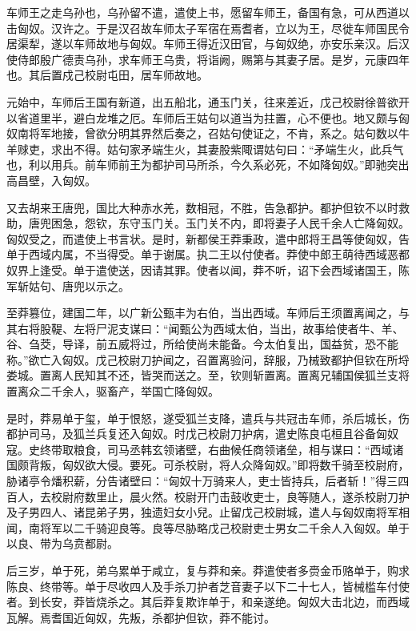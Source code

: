 \documentclass[12pt,UTF8]{ctexbook}
\begin{document}
车师王之走乌孙也，乌孙留不遣，遣使上书，愿留车师王，备国有急，可从西道以击匈奴。汉许之。于是汉召故车师太子军宿在焉耆者，立以为王，尽徙车师国民令居渠犁，遂以车师故地与匈奴。车师王得近汉田官，与匈奴绝，亦安乐亲汉。后汉使侍郎殷广德责乌孙，求车师王乌贵，将诣阙，赐第与其妻子居。是岁，元康四年也。其后置戍己校尉屯田，居车师故地。



元始中，车师后王国有新道，出五船北，通玉门关，往来差近，戊己校尉徐普欲开以省道里半，避白龙堆之厄。车师后王姑句以道当为拄置，心不便也。地又颇与匈奴南将军地接，曾欲分明其界然后奏之，召姑句使证之，不肯，系之。姑句数以牛羊赇吏，求出不得。姑句家矛端生火，其妻股紫陬谓姑句曰：“矛端生火，此兵气也，利以用兵。前车师前王为都护司马所杀，今久系必死，不如降匈奴。”即驰突出高昌壁，入匈奴。



又去胡来王唐兜，国比大种赤水羌，数相冠，不胜，告急都护。都护但钦不以时救助，唐兜困急，怨钦，东守玉门关。玉门关不内，即将妻子人民千余人亡降匈奴。匈奴受之，而遣使上书言状。是时，新都侯王莽秉政，遣中郎将王昌等使匈奴，告单于西域内属，不当得受。单于谢属。执二王以付使者。莽使中郎王萌待西域恶都奴界上逢受。单于遣使送，因请其罪。使者以闻，莽不听，诏下会西域诸国王，陈军斩姑句、唐兜以示之。



至莽篡位，建国二年，以广新公甄丰为右伯，当出西域。车师后王须置离闻之，与其右将股鞮、左将尸泥支谋曰：“闻甄公为西域太伯，当出，故事给使者牛、羊、谷、刍茭，导译，前五威将过，所给使尚未能备。今太伯复出，国益贫，恐不能称。”欲亡入匈奴。戊己校尉刀护闻之，召置离验问，辞服，乃械致都护但钦在所埒娄城。置离人民知其不还，皆哭而送之。至，钦则斩置离。置离兄辅国侯狐兰支将置离众二千余人，驱畜产，举国亡降匈奴。



是时，莽易单于玺，单于恨怒，遂受狐兰支降，遣兵与共冠击车师，杀后城长，伤都护司马，及狐兰兵复还入匈奴。时戊己校尉刀护病，遣史陈良屯桓且谷备匈奴寇。史终带取粮食，司马丞韩玄领诸壁，右曲候任商领诸垒，相与谋曰：“西域诸国颇背叛，匈奴欲大侵。要死。可杀校尉，将人众降匈奴。”即将数千骑至校尉府，胁诸亭令燔积薪，分告诸壁曰：“匈奴十万骑来人，吏士皆持兵，后者斩！”得三四百人，去校尉府数里止，晨火然。校尉开门击鼓收吏士，良等随人，遂杀校尉刀护及子男四人、诸昆弟子男，独遗妇女小兒。止留戊己校尉城，遣人与匈奴南将军相闻，南将军以二千骑迎良等。良等尽胁略戊己校尉吏士男女二千余人入匈奴。单于以良、带为乌贲都尉。



后三岁，单于死，弟乌累单于咸立，复与莽和亲。莽遣使者多赍金币赂单于，购求陈良、终带等。单于尽收四人及手杀刀护者芝音妻子以下二十七人，皆械槛车付使者。到长安，莽皆烧杀之。其后莽复欺诈单于，和亲遂绝。匈奴大击北边，而西域瓦解。焉耆国近匈奴，先叛，杀都护但钦，莽不能讨。
\end{document}
